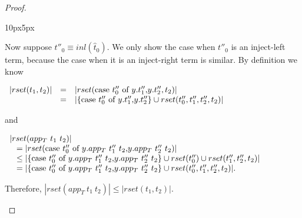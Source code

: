 \begin{proof}
\begin{changemargin}{10px}{5px}
\begin{itemize}
\begin{itemize}
    Now suppose $t''_0 \equiv inl(\hat{t}_0)$.  We only show the case when $t''_0$ is an
    inject-left term, because the case when it is an inject-right term is similar.  By
    definition we know 
    \begin{center}
      \begin{math}
        \begin{array}{lll}
          |rset(t_1,t_2)| & = & |rset(\mbox{case}\ t''_0\ \text{of}\ y\text{.}t''_1\text{,}y\text{.}t''_2, t_2)|\\
          & = & |\{\mbox{case}\ t''_0\ \text{of}\ y\text{.}t''_1\text{,}y\text{.}t''_2\} \cup rset(t''_0,t''_1,t''_2,t_2)|
        \end{array}
      \end{math}
    \end{center}
    and 
    \begin{center}
      \small
      \begin{math}
        \begin{array}{lll}
          |rset(app_T\ t_1\ t_2)| \\
          \,\,\,\,\,= |rset(\mbox{case}\ t''_0\ \text{of}\ y\text{.}app_T\ t''_1\ t_2\text{,}y\text{.}app_T\ t''_2\ t_2)|\\
          \,\,\,\,\,\leq |\{\mbox{case}\ t''_0\ \text{of}\ y\text{.}app_T\ t''_1\ t_2\text{,}y\text{.}app_T\ t''_2\ t_2\} \cup rset(t''_0) \cup rset(t''_1, t''_2, t_2)|\\
          \,\,\,\,\,= |\{\mbox{case}\ t''_0\ \text{of}\ y\text{.}app_T\ t''_1\ t_2\text{,}y\text{.}app_T\ t''_2\ t_2\} \cup rset(t''_0, t''_1, t''_2, t_2)|.
        \end{array}
      \end{math}
    \end{center}
    Therefore, $|rset(app_T\ t_1\ t_2)| \leq |rset(t_1,t_2)|$.
  \end{itemize}


\end{itemize}
\end{changemargin}
\end{proof}
